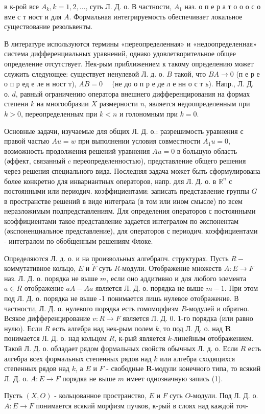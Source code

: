 \documentclass[10pt]{article}
\begin{document}
в к-рой все $A_{k}, k=1,2, \ldots$, суть Л. Д. о. В частности, $A_{1}$ наз. о п е р а т о о о с о вме с т ност и для $A$. Формальная интегрируемость обеспечивает локальное существование резольвенты.



В литературе используются термины «переопределенная» и «недоопределенная» система дифференциальных уравнений, однако удовлетворительное общее определение отсутствует. Нек-рым приближением к такому определению может служить следующее: существует ненулевой Л. д. о. $B$ такой, что $B A \rightarrow 0$ (п е р е о п р ед е ле н ност т), $A B=0 \quad$ (не до о п р е де л е нн о с т ь). Напр., Л. Д. о. $d$, равный ограничению оператора внешнего дифференцирования на формах степени $k$ на многообразии $X$ размерности $n$, является недоопределенным при $k>0$, переопределенным при $k<n$ и голономным при $k=0$.



Основные задачи, изучаемые для общих Л. Д. о.: разрешимость уравнения с правой частью $A u=w$ при выполнении условия совместности $A_{1} u=0$, возможность продолжения решений уравнения $A u=0$ в большую область (әффект, связанный $c$ переопределенностью), представление общего решения через решения специального вида. Последняя задача может быть сформулирована более конкретно для инвариантных операторов, напр. для Л. Д. о. в $\mathbb{R}^{n}$ с постоянными или периодич. коэффициентами: записать представление группы $G$ в пространстве решений в виде интеграла (в том или ином смысле) по всем неразложимым подпредставлениям. Для определения операторов с постоянными коэффициентами такое представление задается интегралом по әкспонентам (әкспоненциальное представление), для операторов с периодич. коэффициентами - интегралом по обобщенным решениям Флоке.



Определяются Л. д. о. и на произвольных алгебрапч. структурах. Пусть $R-$ коммутативное кольцо, $E$ и $\dot{F}$ суть $R$-модули. Отображение множеств $A: E \rightarrow F$ наз. Л. Д. о. порядка не выше $m$, если оно аддитивно и для любого элемента $a \in R$ отображение $a A-A a$ является Л. Д. о. порядка не выше $m-1$. При этом под Л. Д. о. порядка не выше -1 понимается лишь нулевое отображение. В частности, Л. Д. о. нулевого порядка есть гомоморфизм $R$-модулей и обратно. Всякое дифференцирование $v: R \rightarrow F$ является Л. Д. 0. 1-го порядка (или равно нулю). Если $R$ есть алгебра над нек-рым полем $k$, то под Л. Д. о. над $\boldsymbol{R}$ понимается Л. Д. о. над кольцом $R$, к-рый является $k$-линейным отображением. Такой Л. Д. о. обладает рядом формальных свойств обычных Л. д. о. Если $R$ есть алгебра всех формальных степенных рядов над $k$ или алгебра сходящихся степенных рядов над $k$, а $E$ и $F$ - свободные $\boldsymbol{R}$-модули конечного типа, то всякий Л. Д. $о$. $A: E \rightarrow F$ порядка не выше $m$ имеет однозначную запись (1).



Пусть $(X, O)$ - кольцованное пространство, $E$ и $F$ суть $O$-модули. Под Л. Д. о. $A: E \rightarrow F$ понимается всякий морфизм пучков, к-рый в слоях над каждой точ-
\end{document}
